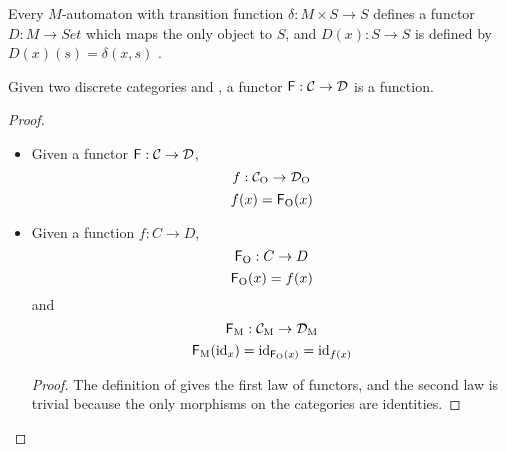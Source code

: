 \begin{example}

  \label{ex:functor-automata-3}

  Every $M$-automaton with transition function $\delta: M \times S \to S$
  defines a functor $D: M \to Set$ which maps the only object to $S$, and
  $D(x): S \to S$ is defined by $D(x)(s) = \delta(x,s)$
  \parencite[430]{poigne-1992}.

\end{example}

\begin{example}[Functions]

  \label{ex:functor-function}


  Given two discrete categories  and , a functor
  $\mathsf{F}: \mathcal{C} \to \mathcal{D}$ is a function.

  \begin{proof}
    \hfill
    \begin{itemize}
    \item
      Given a functor $\mathsf{F}: \mathcal{C} \to \mathcal{D}$,
      \begin{equation*}
        f: \mathcal{C}_{\operatorname{O}} \to \mathcal{D}_{\operatorname{O}}
      \end{equation*}
      \begin{equation*}
        f(x) = \mathsf{F}_{\operatorname{O}}(x)
      \end{equation*}
    \item
      Given a function $f: C \to D$,
      \begin{equation*}
        \mathsf{F}_{\operatorname{O}}: C \to D
      \end{equation*}
      \begin{equation*}
        \mathsf{F}_{\operatorname{O}}(x) = f(x)
      \end{equation*}
      and
      \begin{equation*}
        \mathsf{F}_{\operatorname{M}}: \mathcal{C}_{\operatorname{M}} \to \mathcal{D}_{\operatorname{M}}
      \end{equation*}
      \begin{equation*}
        \mathsf{F}_{\operatorname{M}}(\operatorname{id}_{x}) = \operatorname{id}_{\mathsf{F}_{\operatorname{O}}(x)} = \operatorname{id}_{f(x)}
      \end{equation*}

      \begin{proof}
        The definition of  gives the first law of functors, and the
        second law is trivial because the only morphisms on the categories are
        identities.
      \end{proof}
    \end{itemize}
  \end{proof}

\end{example}

